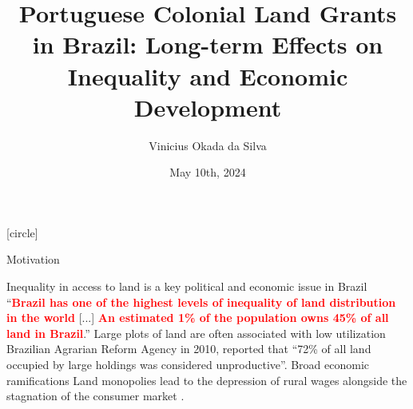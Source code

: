 \documentclass[aspectratio=1610]{beamer}
\title{Portuguese Colonial Land Grants in Brazil: Long-term Effects on Inequality and Economic Development}
\author{Vinicius Okada da Silva}
\date{May 10th, 2024}
\begin{document}
[circle]

\begin{frame}
	\titlepage
\end{frame}



\begin{frame}{Motivation}
    \begin{outline}
        \1 Inequality in access to land is a key political and economic issue in Brazil
            \vspace{2mm}
            \2 ``\textcolor{red}{\textbf{Brazil has one of the highest levels of inequality of land distribution in the world}} [...] \textcolor{red}{\textbf{An estimated 1\% of the population owns 45\% of all land in Brazil}}.'' \parencite{Usaid2016-xs}
        \vspace{2mm}
        \pause 
        \1 Large plots of land are often associated with low utilization \parencite[p.~1]{De_Oliveira_Andrade1980-xz}
        \pause 
        \vspace{2mm}
            \2 Brazilian Agrarian Reform Agency in 2010, reported that ``72\% of all land occupied by large holdings was considered unproductive''.
        \vspace{2mm}
        \pause 
        \1 Broad economic ramifications
            \vspace{2mm}
            \2 Land monopolies lead to the depression of rural wages alongside the stagnation of the consumer market \parencite[p.~1]{De_Oliveira_Andrade1980-xz}.
    \end{outline}
\end{frame}
\end{document}
